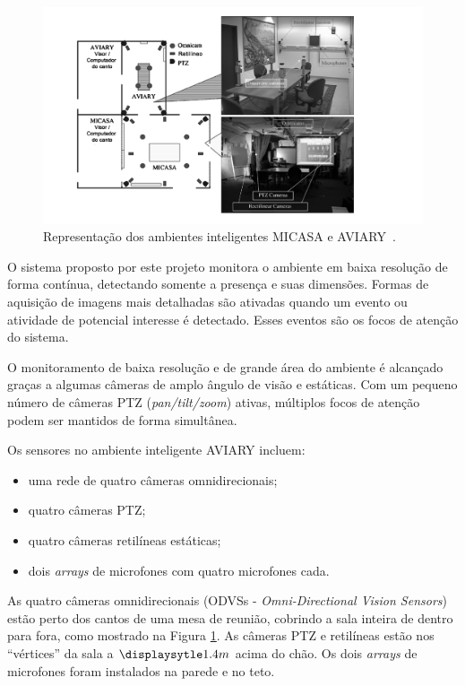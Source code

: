 \begin{figure}[hbt]
		\begin{center}
	\includegraphics[scale=0.5]{figuras/3.TrabalhosCorrelatos/micasa_aviary.png}
		\end{center}
		\caption{Representação dos ambientes inteligentes MICASA e AVIARY~\cite{trivedi}.}
		\label{micasa_aviary}
	\end{figure}

O sistema proposto por este projeto monitora o ambiente em baixa resolução de forma contínua, detectando somente a presença e suas dimensões. Formas de aquisição de imagens mais detalhadas são ativadas quando um evento ou atividade de potencial interesse é detectado. Esses eventos são os focos de atenção do sistema.

O monitoramento de baixa resolução e de grande área do ambiente é alcançado graças a algumas câmeras de amplo ângulo de visão e estáticas. Com um pequeno número de câmeras PTZ (\textit{pan/tilt/zoom}) ativas, múltiplos focos de atenção podem ser mantidos de forma simultânea.

Os sensores no ambiente inteligente AVIARY incluem:

	\begin{itemize}
		\item uma rede de quatro câmeras omnidirecionais;
		\item quatro câmeras PTZ;
		\item quatro câmeras retilíneas estáticas;
		\item dois \textit{arrays} de microfones com quatro microfones cada.
	\end{itemize}

As quatro câmeras omnidirecionais (ODVSs - \textit{Omni-Directional Vision Sensors}) estão perto dos cantos de uma mesa de reunião, cobrindo a sala inteira de dentro para fora, como mostrado na Figura \ref{micasa_aviary}. As câmeras PTZ e retilíneas estão nos ``vértices'' da sala a $\displaysytle 1.4m$ acima do chão. Os dois \textit{arrays} de microfones foram instalados na parede e no teto.

